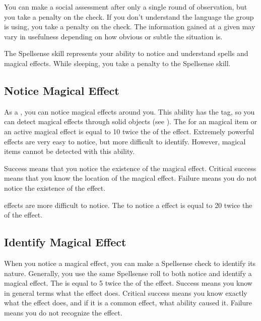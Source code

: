         You can make a social assessment after only a single round of observation, but you take a  penalty on the check.
        If you don't understand the language the group is using, you take a  penalty on the check.
        The information gained at a given  may vary in usefulness depending on how obvious or subtle the situation is.

\newpage
{}
        The Spellsense skill represents your ability to notice and understand spells and magical effects.
        While sleeping, you take a  penalty to the Spellsense skill.


    \subsection{Notice Magical Effect}
        As a , you can notice magical effects around you.
        This ability has the  tag, so you can detect magical effects through solid objects (see ).
        The  for an  magical item or an active magical effect is equal to 10 \sub twice the  of the effect.
        Extremely powerful effects are very easy to notice, but more difficult to identify.
        However,  magical items cannot be detected with this ability.

        Success means that you notice the existence of the magical effect.
        Critical success means that you know the location of the magical effect.
        Failure means you do not notice the existence of the effect.

         effects are more difficult to notice.
        The  to notice a  effect is equal to 20 \add twice the  of the effect.
        
    \subsection{Identify Magical Effect}
        When you notice a magical effect, you can make a Spellsense check to identify its nature.
        Generally, you use the same Spellsense roll to both notice and identify a magical effect.
        The  is equal to 5 \add twice the  of the effect.
        Success means you know in general terms what the effect does.
        Critical success means you know exactly what the effect does, and if it is a common effect, what ability caused it.
        Failure means you do not recognize the effect.

